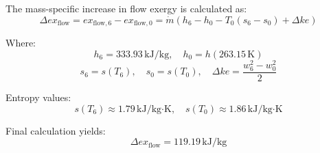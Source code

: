 The mass-specific increase in flow exergy is calculated as:  
\[
\Delta ex_{\text{flow}} = ex_{\text{flow},6} - ex_{\text{flow},0} = \dot{m} \left( h_6 - h_0 - T_0 (s_6 - s_0) + \Delta ke \right)
\]  

Where:  
\[
h_6 = 333.93 \, \text{kJ/kg}, \quad h_0 = h(263.15 \, \text{K})
\]  
\[
s_6 = s(T_6), \quad s_0 = s(T_0), \quad \Delta ke = \frac{w_6^2 - w_0^2}{2}
\]  

Entropy values:  
\[
s(T_6) \approx 1.79 \, \text{kJ/kg·K}, \quad s(T_0) \approx 1.86 \, \text{kJ/kg·K}
\]  

Final calculation yields:  
\[
\Delta ex_{\text{flow}} = 119.19 \, \text{kJ/kg}
\]